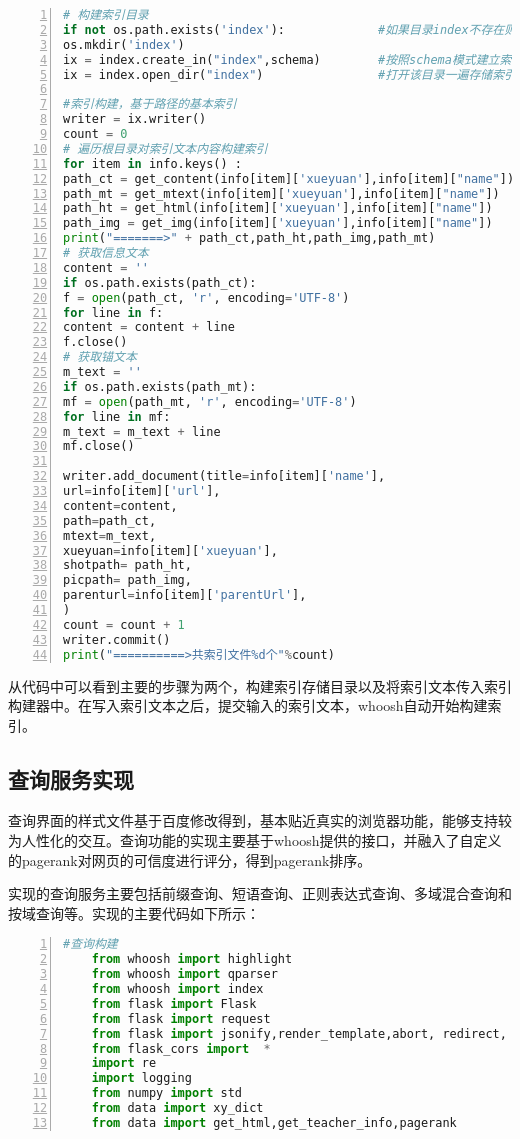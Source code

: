 \documentclass[lang=cn,11pt]{elegantpaper}
\begin{document}
\begin{lstlisting}[language = Python, numbers=left, 
numberstyle=\tiny,keywordstyle=\color{blue!70},
commentstyle=\color{red!50!green!50!blue!50},frame=shadowbox,
rulesepcolor=\color{red!20!green!20!blue!20},basicstyle=\ttfamily]
# 构建索引目录
if not os.path.exists('index'):             #如果目录index不存在则创建
os.mkdir('index')
ix = index.create_in("index",schema)        #按照schema模式建立索引目录
ix = index.open_dir("index")                #打开该目录一遍存储索引文件

#索引构建，基于路径的基本索引
writer = ix.writer()
count = 0
# 遍历根目录对索引文本内容构建索引
for item in info.keys() :
path_ct = get_content(info[item]['xueyuan'],info[item]["name"])
path_mt = get_mtext(info[item]['xueyuan'],info[item]["name"])
path_ht = get_html(info[item]['xueyuan'],info[item]["name"])
path_img = get_img(info[item]['xueyuan'],info[item]["name"])
print("=======>" + path_ct,path_ht,path_img,path_mt)
# 获取信息文本
content = ''
if os.path.exists(path_ct):
f = open(path_ct, 'r', encoding='UTF-8')
for line in f:
content = content + line
f.close()
# 获取锚文本
m_text = ''
if os.path.exists(path_mt):
mf = open(path_mt, 'r', encoding='UTF-8')
for line in mf:
m_text = m_text + line
mf.close()

writer.add_document(title=info[item]['name'],
url=info[item]['url'],
content=content,
path=path_ct,
mtext=m_text,
xueyuan=info[item]['xueyuan'],
shotpath= path_ht,
picpath= path_img,
parenturl=info[item]['parentUrl'],
)
count = count + 1
writer.commit()
print("==========>共索引文件%d个"%count)
\end{lstlisting}



从代码中可以看到主要的步骤为两个，构建索引存储目录以及将索引文本传入索引构建器中。在写入索引文本之后，提交输入的索引文本，whoosh自动开始构建索引。


\subsection{查询服务实现}
查询界面的样式文件基于百度修改得到，基本贴近真实的浏览器功能，能够支持较为人性化的交互。查询功能的实现主要基于whoosh提供的接口，并融入了自定义的pagerank对网页的可信度进行评分，得到pagerank排序。

实现的查询服务主要包括前缀查询、短语查询、正则表达式查询、多域混合查询和按域查询等。实现的主要代码如下所示：

\begin{lstlisting}[language = Python, numbers=left, 
numberstyle=\tiny,keywordstyle=\color{blue!70},
commentstyle=\color{red!50!green!50!blue!50},frame=shadowbox,
rulesepcolor=\color{red!20!green!20!blue!20},basicstyle=\ttfamily]
	#查询构建
	from whoosh import highlight
	from whoosh import qparser
	from whoosh import index
	from flask import Flask
	from flask import request
	from flask import jsonify,render_template,abort, redirect, url_for,session, escape,Markup
	from flask_cors import  *
	import re
	import logging
	from numpy import std
	from data import xy_dict
	from data import get_html,get_teacher_info,pagerank
\end{lstlisting}
\end{document}
